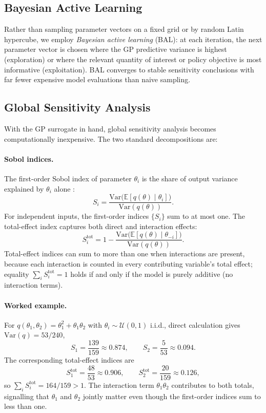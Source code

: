 \documentclass[11pt,a4paper]{report}
\begin{document}
\subsection{Bayesian Active Learning}

Rather than sampling parameter vectors on a fixed grid or by random Latin hypercube, we employ \emph{Bayesian active learning} (BAL): at each iteration, the next parameter vector is chosen where the GP predictive variance is highest (exploration) or where the relevant quantity of interest or policy objective is most informative (exploitation).  BAL converges to stable sensitivity conclusions with far fewer expensive model evaluations than naive sampling.

\subsection{Global Sensitivity Analysis}

With the GP surrogate in hand, global sensitivity analysis becomes computationally inexpensive.  The two standard decompositions are:

\paragraph{Sobol indices.}
The first-order Sobol index of parameter $\theta_i$ is the share of output variance explained by $\theta_i$ alone \citep{sobol1967distribution, saltelli2008global}:
\begin{equation}
S_i = \frac{\mathrm{Var}\bigl(\mathbb{E}[q(\theta) \mid \theta_i]\bigr)}{\mathrm{Var}(q(\theta))}.
\label{eq:sobol_first}
\end{equation}
For independent inputs, the first-order indices $\{S_i\}$ sum to at most one.  The total-effect index captures both direct and interaction effects:
\begin{equation}
S_i^{\mathrm{tot}} = 1 - \frac{\mathrm{Var}\bigl(\mathbb{E}[q(\theta) \mid \theta_{-i}]\bigr)}{\mathrm{Var}(q(\theta))}.
\label{eq:sobol_total}
\end{equation}
Total-effect indices can sum to more than one when interactions are present, because each interaction is counted in every contributing variable's total effect; equality $\sum_i S_i^{\mathrm{tot}} = 1$ holds if and only if the model is purely additive (no interaction terms).

\paragraph{Worked example.}
For $q(\theta_1, \theta_2) = \theta_1^2 + \theta_1\theta_2$ with $\theta_i \sim \mathcal{U}(0,1)$ i.i.d., direct calculation gives $\mathrm{Var}(q)=53/240$,
\[
S_1=\frac{139}{159}\approx 0.874,\qquad
S_2=\frac{5}{53}\approx 0.094.
\]
The corresponding total-effect indices are
\[
S_1^{\mathrm{tot}}=\frac{48}{53}\approx 0.906,\qquad
S_2^{\mathrm{tot}}=\frac{20}{159}\approx 0.126,
\]
so $\sum_i S_i^{\mathrm{tot}}=164/159>1$.  The interaction term $\theta_1\theta_2$ contributes to both totals, signalling that $\theta_1$ and $\theta_2$ jointly matter even though the first-order indices sum to less than one.
\end{document}
